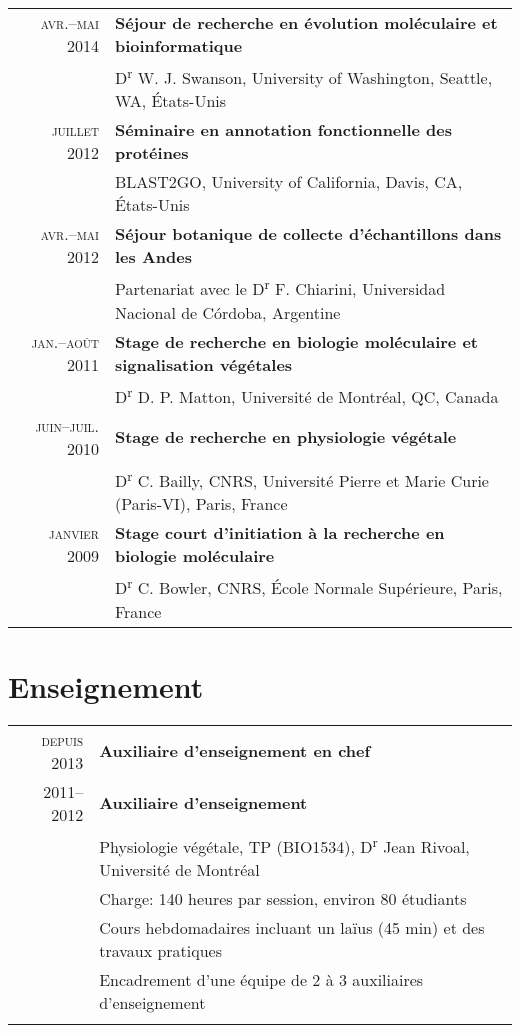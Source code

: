 \documentclass[letterpaper,10pt]{article}
\begin{document}
{\begin{tabular}{r|p{12.5cm}}
\textsc{avr.--mai 2014} & \textbf{Séjour de recherche en évolution moléculaire et bioinformatique} \\
& D\textsuperscript{r} W. J. Swanson, University of Washington, Seattle, WA, États-Unis  \vspace{1.5mm} \\

\textsc{juillet 2012} & \textbf{Séminaire en annotation fonctionnelle des protéines} \\
& BLAST2GO, University of California, Davis, CA, États-Unis \vspace{1.5mm} \\

\textsc{avr.--mai 2012} & \textbf{Séjour botanique de collecte d'échantillons dans les Andes} \\
& Partenariat avec le D\textsuperscript{r} F. Chiarini, Universidad Nacional de Córdoba, Argentine \vspace{1.5mm} \\

\textsc{jan.--août 2011} & \textbf{Stage de recherche en biologie moléculaire et signalisation végétales} \\
& D\textsuperscript{r} D. P. Matton, Université de Montréal, QC, Canada  \vspace{1.5mm} \\

\textsc{juin--juil. 2010} & \textbf{Stage de recherche en physiologie végétale} \\
& D\textsuperscript{r} C. Bailly, CNRS, Université Pierre et Marie Curie (Paris-VI), Paris, France \vspace{1.5mm} \\

\textsc{janvier 2009} & \textbf{Stage court d'initiation à la recherche en biologie moléculaire} \\
& D\textsuperscript{r} C. Bowler, CNRS, École Normale Supérieure, Paris, France \\
\end{tabular}


\section{Enseignement}
\begin{tabular}{r|p{12.5cm}}
\textsc{depuis 2013} & \textbf{Auxiliaire d'enseignement en chef} \\
\textsc{2011--2012} & \textbf{Auxiliaire d'enseignement} \\
& Physiologie végétale, TP (BIO1534), D\textsuperscript{r} Jean Rivoal, Université de Montréal \\
& {\textbullet{} Charge: 140 heures par session, environ 80 étudiants} \\
& {\textbullet{} Cours hebdomadaires incluant un laïus (45 min) et des travaux pratiques} \\
& {\textbullet{} Encadrement d'une équipe de 2 à 3 auxiliaires d'enseignement} \\
\multicolumn{2}{c}{} \\


\end{tabular}}
\end{document}
